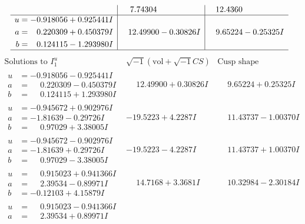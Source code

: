 \documentclass[1p]{elsarticle_modified}
\theoremstyle{definition}
\newcommand{\I}{\sqrt{-1}}
\begin{document}
$$\begin{array}{c|c|c}
 & \phantom{-}7.74304\phantom{ +0.000000I} & \phantom{-}12.4360\phantom{ +0.000000I} \\ \hline\begin{aligned}
u &= -0.918056 + 0.925441 I \\
a &= \phantom{-}0.220309 + 0.450379 I \\
b &= \phantom{-}0.124115 - 1.293980 I\end{aligned}
 & \phantom{-}12.49900 - 0.30826 I & \phantom{-}9.65224 - 0.25325 I\\
 \hline 
 \end{array}$$\newpage$$\begin{array}{c|c|c}  
\text{Solutions to }I^u_{1}& \I (\text{vol} + \sqrt{-1}CS) & \text{Cusp shape}\\
 \hline 
\begin{aligned}
u &= -0.918056 - 0.925441 I \\
a &= \phantom{-}0.220309 - 0.450379 I \\
b &= \phantom{-}0.124115 + 1.293980 I\end{aligned}
 & \phantom{-}12.49900 + 0.30826 I & \phantom{-}9.65224 + 0.25325 I \\ \hline\begin{aligned}
u &= -0.945672 + 0.902976 I \\
a &= -1.81639 - 0.29726 I \\
b &= \phantom{-}0.97029 + 3.38005 I\end{aligned}
 & -19.5223 + 4.2287 I & \phantom{-}11.43737 - 1.00370 I \\ \hline\begin{aligned}
u &= -0.945672 - 0.902976 I \\
a &= -1.81639 + 0.29726 I \\
b &= \phantom{-}0.97029 - 3.38005 I\end{aligned}
 & -19.5223 - 4.2287 I & \phantom{-}11.43737 + 1.00370 I \\ \hline\begin{aligned}
u &= \phantom{-}0.915023 + 0.941366 I \\
a &= \phantom{-}2.39534 - 0.89971 I \\
b &= -0.12103 + 4.15879 I\end{aligned}
 & \phantom{-}14.7168 + 3.3681 I & \phantom{-}10.32984 - 2.30184 I \\ \hline\begin{aligned}
u &= \phantom{-}0.915023 - 0.941366 I \\
a &= \phantom{-}2.39534 + 0.89971 I \\

\end{aligned}
\end{array}$$
\end{document}
